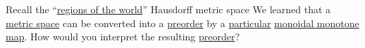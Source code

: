 Recall the ``\hyperref[E2.52]{regions of the world}'' Hausdorff metric space We learned that a \hyperref[D2.51]{metric space} can be converted into a \hyperref[D1.30]{preorder} by a \hyperref[X2.65]{particular} \hyperref[D2.41]{monoidal monotone map}. How would you interpret the resulting \hyperref[D1.30]{preorder}?